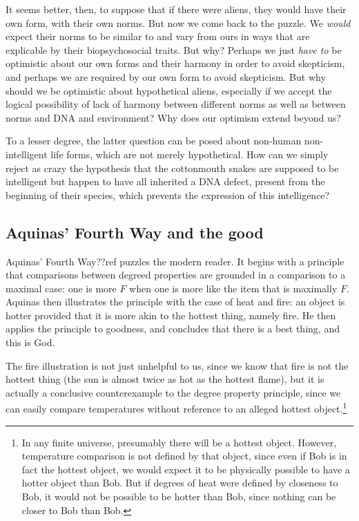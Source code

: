 It seems better, then, to suppose that if there were aliens, they would have their own form, with their own norms.
But now we come back to the puzzle. We \textit{would} expect their norms to be similar to and vary from ours in ways
that are explicable by their biopsychosocial traits. But why? Perhaps we just \textit{have to} be optimistic about 
our own forms and their harmony in order to avoid skepticism, and perhaps we are required by our own form to avoid 
skepticism. But why should we be optimistic about hypothetical aliens, especially if we accept the logical possibility
of lack of harmony between different norms as well as between norms and DNA and environment? Why does our optimism
extend beyond us?

To a lesser degree, the latter question can be posed about non-human non-intelligent life forms, which are not merely
hypothetical. How can we simply reject as crazy the hypothesis that the cottonmouth snakes are supposed to be 
intelligent but happen to have all inherited a DNA defect, present from the beginning of their species, which 
prevents the expression of this intelligence?

\subsection{Aquinas' Fourth Way and the good}
Aquinas' Fourth Way??ref puzzles the modern reader. It begins with a principle that comparisons between
degreed properties are grounded in a comparison to a maximal case: one is more $F$ when one is more like
the item that is maximally $F$. Aquinas then illustrates the principle with the case of heat and fire:
an object is hotter provided that it is more akin to the hottest thing, namely fire. He then applies
the principle to goodness, and concludes that there is a best thing, and this is God.

The fire illustration is not just unhelpful to us, since we know that fire is not the hottest thing (the sun is almost
twice as hot as the hottest flame), but it is actually a conclusive counterexample to the degree property principle,
since we can easily compare temperatures without reference to an alleged hottest object.\footnote{In any finite universe,
presumably there will be a hottest object. However, temperature comparison is not defined by that object, since 
even if Bob is in fact the hottest object, we would expect it to be physically possible to have a hotter object 
than Bob. But if degrees of heat were defined by closeness to Bob, it would not be possible to be hotter than
Bob, since nothing can be closer to Bob than Bob.}

